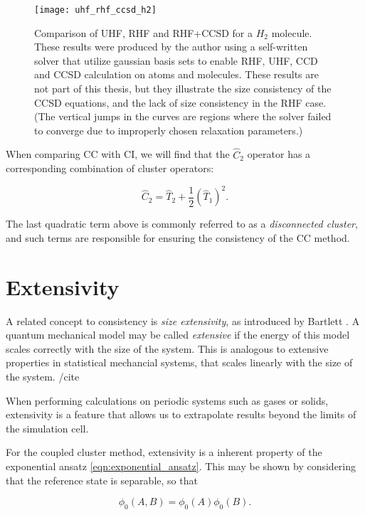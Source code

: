 \begin{figure}[p]
    \centering
    \texttt{[image: uhf\_rhf\_ccsd\_h2]}
    \caption{Comparison of UHF, RHF and RHF+CCSD for a $H_2$ molecule. These results were produced by the author using a self-written solver \cite{FermionMingle} that utilize gaussian basis sets to enable RHF, UHF, CCD and CCSD calculation on atoms and molecules. These results are not part of this thesis, but they illustrate the size consistency of the CCSD equations, and the lack of size consistency in the RHF case. (The vertical jumps in the curves are regions where the solver failed to converge due to improperly chosen relaxation parameters.)}
    \label{fig:uhf_rhf_ccsd_h2}
\end{figure}


When comparing CC with CI, we will find that the $\hat{C}_2$ operator has a corresponding combination of cluster operators:

\begin{equation}
\hat{C}_2 = \hat{T}_2 + \frac{1}{2}(\hat{T}_1)^2.
\end{equation} 

The last quadratic term above is commonly referred to as a \emph{disconnected cluster}, and such terms are responsible for ensuring the consistency of the CC method.



\section{Extensivity}

A related concept to consistency is \emph{size extensivity}, as introduced by Bartlett \cite{Bartlett1981}. A quantum mechanical model may be called \emph{extensive} if the energy of this model scales correctly with the size of the system. \cite[p.11]{ShavittBartlett2009} This is analogous to extensive properties in statistical mechancial systems, that scales linearly with the size of the system. /cite{} 

When performing calculations on periodic systems such as gases or solids, extensivity is a feature that allows us to extrapolate results beyond the limits of the simulation cell.

For the coupled cluster method, extensivity is a inherent property of the exponential ansatz \ref{eqn:exponential_ansatz}. This may be shown by considering that the reference state is separable, so that

\begin{equation}
\phi_0(A,B) = \phi_0(A)\phi_0(B).
\end{equation}

